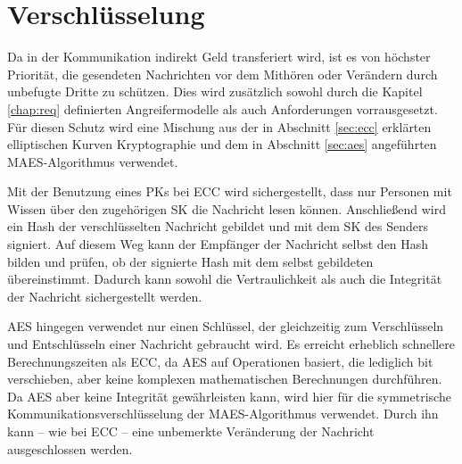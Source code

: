 \documentclass[
	fontsize=11pt,
	headings=small,
	parskip=half,           %
	bibliography=totoc,
	numbers=noenddot,       %
	open=any,               %
]{scrreprt}
\begin{document}

\section{Verschlüsselung}
Da in der Kommunikation indirekt Geld transferiert wird, ist es von höchster Priorität, die gesendeten Nachrichten vor dem Mithören oder Verändern durch unbefugte Dritte zu schützen. Dies wird zusätzlich sowohl durch die Kapitel \ref{chap:req} definierten Angreifermodelle als auch Anforderungen vorrausgesetzt. Für diesen Schutz wird eine Mischung aus der in Abschnitt \ref{sec:ecc} erklärten elliptischen Kurven Kryptographie und dem in Abschnitt \ref{sec:aes} angeführten MAES-Algorithmus verwendet. 

Mit der Benutzung eines PKs bei ECC wird sichergestellt, dass nur Personen mit Wissen über den zugehörigen SK die Nachricht lesen können. Anschließend wird ein Hash der verschlüsselten Nachricht gebildet und mit dem SK des Senders signiert. Auf diesem Weg kann der Empfänger der Nachricht selbst den Hash bilden und prüfen, ob der signierte Hash mit dem selbst gebildeten übereinstimmt. Dadurch kann sowohl die Vertraulichkeit als auch die Integrität der Nachricht sichergestellt werden.

AES hingegen verwendet nur einen Schlüssel, der gleichzeitig zum Verschlüsseln und Entschlüsseln einer Nachricht gebraucht wird. Es erreicht erheblich schnellere Berechnungszeiten als ECC, da AES auf Operationen basiert, die lediglich bit verschieben, aber keine komplexen mathematischen Berechnungen durchführen. Da AES aber keine Integrität gewährleisten kann, wird hier für die symmetrische Kommunikationsverschlüsselung der MAES-Algorithmus verwendet. Durch ihn kann -- wie bei ECC -- eine unbemerkte Veränderung der Nachricht ausgeschlossen werden.
\end{document}
